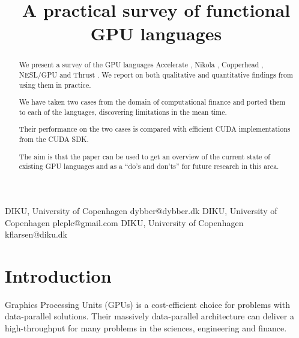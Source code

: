 \documentclass[preprint]{sigplanconf}
\begin{document}
\copyrightdata{[to be supplied]} 


\title{A practical survey of functional GPU languages}

           {DIKU, University of Copenhagen}
           {dybber@dybber.dk}
           {DIKU, University of Copenhagen}
           {plcplc@gmail.com}
           {DIKU, University of Copenhagen}
           {kflarsen@diku.dk}

\maketitle

\begin{abstract}
  We present a survey of the GPU languages Accelerate
  \cite{chakravarty2011accelerating}, Nikola
  \cite{mainland2010nikola}, Copperhead \cite{Catanzaro2011}, NESL/GPU
  \cite{bergstrom2012nested} and Thrust \cite{Thrust}. We report on
  both qualitative and quantitative findings from using them in
  practice.

  We have taken two cases from the domain of computational finance and
  ported them to each of the languages, discovering limitations in the
  mean time. 

  Their performance on the two cases is compared with efficient CUDA
  implementations from the CUDA SDK.

  The aim is that the paper can be used to get an overview of the
  current state of existing GPU languages and as a ``do's and don'ts''
  for future research in this area.
\end{abstract}




\section{Introduction}
Graphics Processing Units (GPUs) is a cost-efficient choice for
problems with data-parallel solutions. Their massively data-parallel
architecture can deliver a high-throughput for many problems in the
sciences, engineering and finance.
\end{document}
